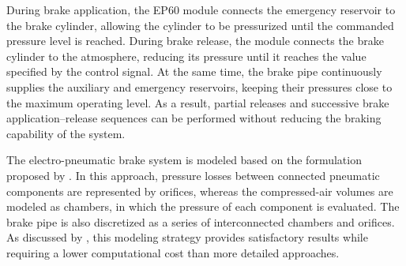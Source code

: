 \documentclass[preprint,10pt]{elsarticle}
\begin{document}
During brake application, the EP60 module connects the emergency reservoir to the brake cylinder, allowing the cylinder to be pressurized until the commanded pressure level is reached. During brake release, the module connects the brake cylinder to the atmosphere, reducing its pressure until it reaches the value specified by the control signal. At the same time, the brake pipe continuously supplies the auxiliary and emergency reservoirs, keeping their pressures close to the maximum operating level. As a result, partial releases and successive brake application--release sequences can be performed without reducing the braking capability of the system.


The electro-pneumatic brake system is modeled based on the formulation proposed by \cite{pugi2013design}. In this approach, pressure losses between connected pneumatic components are represented by orifices, whereas the compressed-air volumes are modeled as chambers, in which the pressure of each component is evaluated. The brake pipe is also discretized as a series of interconnected chambers and orifices. As discussed by \cite{teodoro2019fast}, this modeling strategy provides satisfactory results while requiring a lower computational cost than more detailed approaches.
\end{document}
